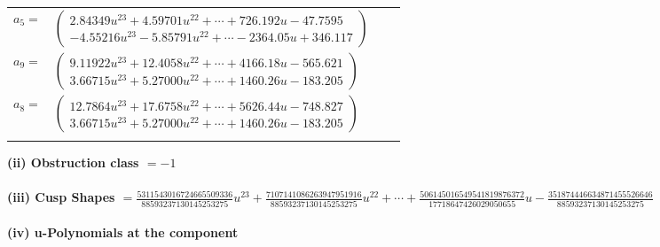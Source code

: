 \documentclass[1p]{elsarticle_modified}
\theoremstyle{definition}
\begin{document}
\begin{tabular}{m{7pt} m{180pt} m{7pt} m{180pt} }
\flushright $a_{5}=$&$\begin{pmatrix}2.84349 u^{23}+4.59701 u^{22}+\cdots+726.192 u-47.7595\\-4.55216 u^{23}-5.85791 u^{22}+\cdots-2364.05 u+346.117\end{pmatrix}$ \\
\flushright $a_{9}=$&$\begin{pmatrix}9.11922 u^{23}+12.4058 u^{22}+\cdots+4166.18 u-565.621\\3.66715 u^{23}+5.27000 u^{22}+\cdots+1460.26 u-183.205\end{pmatrix}$ \\
\flushright $a_{8}=$&$\begin{pmatrix}12.7864 u^{23}+17.6758 u^{22}+\cdots+5626.44 u-748.827\\3.66715 u^{23}+5.27000 u^{22}+\cdots+1460.26 u-183.205\end{pmatrix}$\\&\end{tabular}
\flushleft \textbf{(ii) Obstruction class $= -1$}\\~\\
\flushleft \textbf{(iii) Cusp Shapes $= \frac{5311543016724665509336}{88593237130145253275} u^{23}+\frac{7107141086263947951916}{88593237130145253275} u^{22}+\cdots+\frac{506145016549541819876372}{17718647426029050655} u-\frac{351874446634871455526646}{88593237130145253275}$}\\~\\
\newpage\renewcommand{\arraystretch}{1}
\flushleft \textbf{(iv) u-Polynomials at the component}\newline \\
\end{document}
